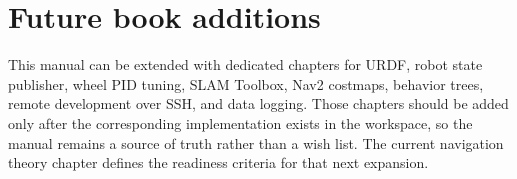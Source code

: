 \section{Future book additions}

This manual can be extended with dedicated chapters for URDF, robot state publisher, wheel PID tuning, SLAM Toolbox, Nav2 costmaps, behavior trees, remote development over SSH, and data logging. Those chapters should be added only after the corresponding implementation exists in the workspace, so the manual remains a source of truth rather than a wish list. The current navigation theory chapter defines the readiness criteria for that next expansion.
